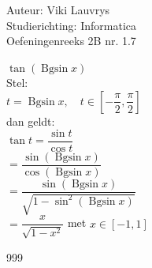 \documentclass[a4paper]{article}
\begin{document}
  
\noindent \large Auteur: Viki	Lauvrys \\
\noindent \large Studierichting: Informatica\\
\noindent \large Oefeningenreeks 2B nr. 1.7\\

\medskip

\normalsize

$\tan(\operatorname{Bgsin}x)$\\

Stel: \\

$ t = \operatorname{Bgsin} x, \quad t \in \left[-\dfrac{\pi}{2}, \dfrac{\pi}{2}\right] $ \\

dan geldt: \\

$ \tan t = \dfrac{\sin t}{\cos t} $ \\

$ = \dfrac{\sin (\operatorname{Bgsin} x)}{\cos (\operatorname{Bgsin} x)} $ \\

$ = \dfrac{\sin (\operatorname{Bgsin} x)}{\sqrt{1-\sin^2 (\operatorname{Bgsin} x)}} $ \\

$ = \dfrac{x}{\sqrt{1-x^2}} $ met $ x \in [-1,1] $ \\


\begin{thebibliography}{999}
\end{thebibliography}
\end{document}
